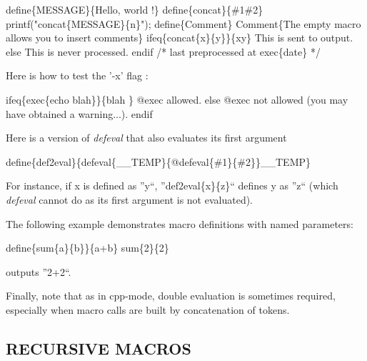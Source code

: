 \begin{PRE}
   {\htmlBackslash}define\{MESSAGE\}\{Hello, world !\}
   {\htmlBackslash}define\{concat\}\{\#1\#2\}
   printf("{\htmlBackslash}concat\{{\htmlBackslash}MESSAGE\}\{{\htmlBackslash}n\}");
   {\htmlBackslash}define\{Comment\} 
   {\htmlBackslash}Comment\{The empty macro allows you to insert comments\}
   {\htmlBackslash}ifeq\{{\htmlBackslash}concat\{x\}\{y\}\}\{xy\}
   This is sent to output.
   {\htmlBackslash}else
   This is never processed.
   {\htmlBackslash}endif
   /* last preprocessed at {\htmlBackslash}exec\{date\} */
\end{PRE}

Here is how to test the '-x' flag : 

\begin{PRE}
   {\htmlBackslash}ifeq\{{\htmlBackslash}exec\{echo blah\}\}\{blah
   \}
   @{\htmlBackslash}exec allowed.
   {\htmlBackslash}else
   @{\htmlBackslash}exec not allowed (you may have obtained a warning...).
   {\htmlBackslash}endif
\end{PRE}

Here is a version of {\it {\htmlBackslash}defeval} that also evaluates its
first argument 

\begin{PRE}
   {\htmlBackslash}define\{def2eval\}\{{\htmlBackslash}defeval\{\_\_TEMP\}\{@{\htmlBackslash}defeval\{\#1\}\{\#2\}\}{\htmlBackslash}\_\_TEMP\}
\end{PRE}

For instance, if x is defined as ''y``,
''{\htmlBackslash}def2eval\{{\htmlBackslash}x\}\{z\}`` defines y as ''z``
(which {\it {\htmlBackslash}defeval} cannot do as its first argument is not
evaluated). 

The following example demonstrates macro definitions with named parameters: 

\begin{PRE}
   {\htmlBackslash}define\{{\htmlBackslash}sum\{a\}\{b\}\}\{{\htmlBackslash}a+{\htmlBackslash}b\}
   {\htmlBackslash}sum\{2\}\{2\}
\end{PRE}

outputs ''2+2``. 

Finally, note that as in cpp-mode, double evaluation is sometimes required,
especially when macro calls are built by concatenation of tokens. 

\htmlHR

\subsection{RECURSIVE MACROS}

